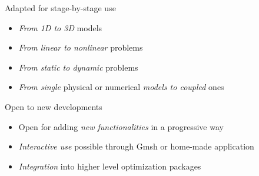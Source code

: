 \begin{slide}

\begin{slideitemize}
\item Adapted for stage-by-stage use
\begin{itemize}
\item \emph{From 1D to 3D} models
\item \emph{From linear to nonlinear} problems
\item \emph{From static to dynamic} problems
\item \emph{From single} physical or numerical \emph{models to coupled} ones
\end{itemize}
\item Open to new developments
\begin{itemize}
\item Open for adding \emph{new functionalities} in a progressive way
\item \emph{Interactive use} possible through Gmsh or home-made application
\item \emph{Integration} into higher level optimization packages
\end{itemize}

\end{slideitemize}

\end{slide}
